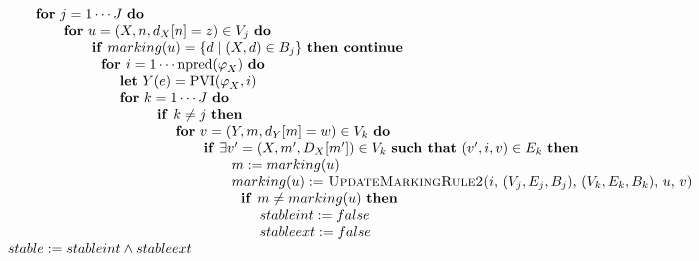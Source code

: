 \begin{equation*}
\begin{array}{l}
\begin{tabular}{l}
$\qquad \qquad $\textbf{for} $j=1\cdots J$ \textbf{do} \\ 
$\qquad \qquad \qquad $\textbf{for} $u=(X,n,d_{X}[n]=z)\in V_{j}$ \textbf{do}
\\ 
$\qquad \qquad \qquad \qquad $\textbf{if} $marking(u)=\{d\mid (X,d)\in
B_{j}\}$ \textbf{then continue} \\ 
$\qquad \qquad \qquad \qquad \text{\textbf{for }}i=1\cdots \mathrm{npred}%
(\varphi _{X})$ \textbf{do} \\ 
$\qquad \qquad \qquad \qquad \qquad $\textbf{let} $Y(e)=\mathrm{PVI}(\varphi
_{X},i)$ \\ 
$\qquad \qquad \qquad \qquad \qquad $\textbf{for} $k=1\cdots J$ \textbf{do}
\\ 
$\qquad \qquad \qquad \qquad \qquad \qquad \text{\textbf{if }}k\neq j$ 
\textbf{then} \\ 
$\qquad \qquad \qquad \qquad \qquad \qquad \qquad $\textbf{for} $%
v=(Y,m,d_{Y}[m]=w)\in V_{k}$ \textbf{do} \\ 
$\qquad \qquad \qquad \qquad \qquad \qquad \qquad \qquad $\textbf{if} $%
\exists v^{\prime }=(X,m^{\prime },D_{X}[m^{\prime }])\in V_{k}$ \textbf{%
such that} $(v^{\prime },i,v)\in E_{k}$ \textbf{then} \\ 
$\qquad \qquad \qquad \qquad \qquad \qquad \qquad \qquad \qquad m:=marking(u)
$ \\ 
$\qquad \qquad \qquad \qquad \qquad \qquad \qquad \qquad \qquad marking(u):=$
\textsc{UpdateMarkingRule2(}$i$, $(V_{j},E_{j},B_{j})$, $(V_{k},E_{k},B_{k})$%
, $u$, $v$\textsc{)} \\ 
$\qquad \qquad \qquad \qquad \qquad \qquad \qquad \qquad \qquad \text{%
\textbf{if }}m\neq marking(u)$ \textbf{then} \\ 
$\qquad \qquad \qquad \qquad \qquad \qquad \qquad \qquad \qquad \qquad
stableint:=false$ \\ 
$\qquad \qquad \qquad \qquad \qquad \qquad \qquad \qquad \qquad \qquad
stableext:=false$ \\ 
$\qquad stable:=stableint\wedge stableext$%
\end{tabular}%
\end{array}%
\end{equation*}%
\newpage \newpage 
